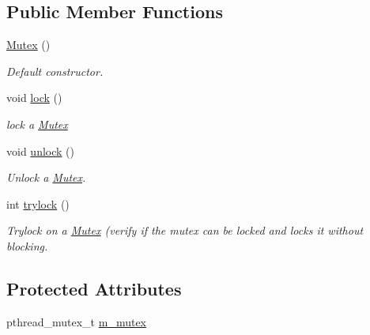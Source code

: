 \subsection*{Public Member Functions}
\begin{DoxyCompactItemize}
\item 
\hypertarget{classmognetwork_1_1_mutex_a281ab0e408b9a388586ee269881d3c26}{\hyperlink{classmognetwork_1_1_mutex_a281ab0e408b9a388586ee269881d3c26}{Mutex} ()}\label{classmognetwork_1_1_mutex_a281ab0e408b9a388586ee269881d3c26}

\begin{DoxyCompactList}\small\item\em Default constructor. \end{DoxyCompactList}\item 
\hypertarget{classmognetwork_1_1_mutex_a880c4341ad8d63c9bde15f4a60af2848}{void \hyperlink{classmognetwork_1_1_mutex_a880c4341ad8d63c9bde15f4a60af2848}{lock} ()}\label{classmognetwork_1_1_mutex_a880c4341ad8d63c9bde15f4a60af2848}

\begin{DoxyCompactList}\small\item\em lock a \hyperlink{classmognetwork_1_1_mutex}{Mutex} \end{DoxyCompactList}\item 
\hypertarget{classmognetwork_1_1_mutex_a9f3e0b542f8e9953eca9df6ae408083e}{void \hyperlink{classmognetwork_1_1_mutex_a9f3e0b542f8e9953eca9df6ae408083e}{unlock} ()}\label{classmognetwork_1_1_mutex_a9f3e0b542f8e9953eca9df6ae408083e}

\begin{DoxyCompactList}\small\item\em Unlock a \hyperlink{classmognetwork_1_1_mutex}{Mutex}. \end{DoxyCompactList}\item 
int \hyperlink{classmognetwork_1_1_mutex_ae4896f5c96a2088d6de667002c046dee}{trylock} ()
\begin{DoxyCompactList}\small\item\em Trylock on a \hyperlink{classmognetwork_1_1_mutex}{Mutex} (verify if the mutex can be locked and locks it without blocking. \end{DoxyCompactList}\end{DoxyCompactItemize}
\subsection*{Protected Attributes}
\begin{DoxyCompactItemize}
\item 
pthread\-\_\-mutex\-\_\-t \hyperlink{classmognetwork_1_1_mutex_a571d9d0b9b2be3da94192f34b6157ea9}{m\-\_\-mutex}
\end{DoxyCompactItemize}


